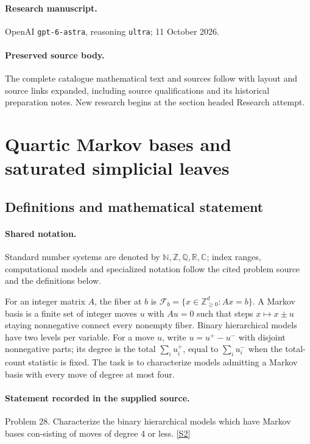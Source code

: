\documentclass[11pt]{article}
\begin{document}
\paragraph{Research manuscript.} OpenAI \texttt{gpt-6-astra}, reasoning \texttt{ultra}; 11 October 2026.
\paragraph{Preserved source body.} The complete catalogue mathematical text and sources follow with layout and source links expanded, including source qualifications and its historical preparation notes. New research begins at the section headed Research attempt.

\section{Quartic Markov bases and saturated simplicial leaves}\label{statement}

\subsection{Definitions and mathematical statement}

\paragraph{Shared notation.}Standard number systems are denoted by $\mathbb N,\mathbb Z,\mathbb Q,\mathbb R,\mathbb C$; index ranges, computational models and specialized notation follow the cited problem source and the definitions below.


For an integer matrix $A$, the fiber at $b$ is $\mathcal F_b=\{x\in\mathbb Z_{\ge0}^d:Ax=b\}$. A Markov basis is a finite set of integer moves $u$ with $Au=0$ such that steps $x\mapsto x\pm u$ staying nonnegative connect every nonempty fiber. Binary hierarchical models have two levels per variable. For a move $u$, write $u=u^+-u^-$ with disjoint nonnegative parts; its degree is the total $\sum_i u_i^+$, equal to $\sum_i u_i^-$ when the total-count statistic is fixed. The task is to characterize models admitting a Markov basis with every move of degree at most four.
\paragraph{Statement recorded in the supplied source.}
Problem 28. Characterize the binary hierarchical models which have Markov bases con-sisting of moves of degree 4 or less. \href{https://aimath.org/WWN/compalgstat/compalgstat.pdf}{[S2]}
\end{document}
